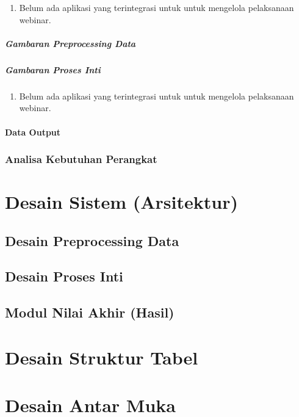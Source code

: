 \lipsum[1]
\begin{enumerate}
  \item Belum ada aplikasi yang terintegrasi untuk untuk mengelola pelaksanaan webinar.
\end{enumerate}

\subparagraph{Gambaran Preprocessing Data}


\subparagraph{Gambaran Proses Inti}


\begin{enumerate}
  \item Belum ada aplikasi yang terintegrasi untuk untuk mengelola pelaksanaan webinar.
\end{enumerate}


\paragraph{Data Output}

\subsubsection{Analisa Kebutuhan Perangkat}

\section{Desain Sistem (Arsitektur)}

\subsection{Desain Preprocessing Data}

\subsection{Desain Proses Inti}

\subsection{Modul Nilai Akhir (Hasil)}

\section{Desain Struktur Tabel}

\section{Desain Antar Muka}

